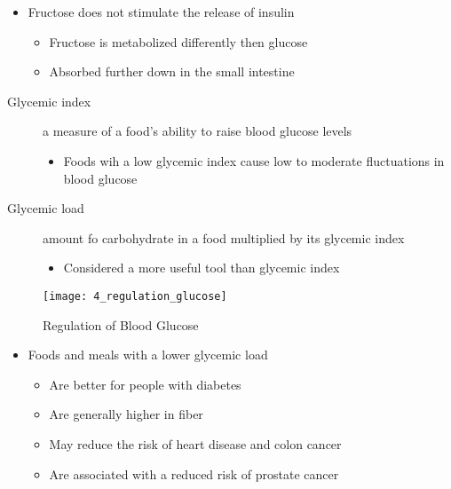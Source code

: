 \documentclass[title={Chapter 4}]{fdsn201notes}
\begin{document}
\begin{itemize}
	\item Fructose does not stimulate the release of insulin
	\begin{itemize}
		\item Fructose is metabolized differently then glucose
		\item Absorbed further down in the small intestine
	\end{itemize}
\end{itemize}

\begin{description}
	\item[Glycemic index] a measure of a food's ability to raise blood glucose levels
	\begin{itemize}
		\item Foods wih a low glycemic index cause low to moderate fluctuations in blood glucose
	\end{itemize}
	\item[Glycemic load] amount fo carbohydrate in a food multiplied by its glycemic index
	\begin{itemize}
		\item Considered a more useful tool than glycemic index
	\end{itemize}
\end{description}

\begin{figure}[H]
	\centering
	\texttt{[image: 4\_regulation\_glucose]}
	\caption{Regulation of Blood Glucose}
	\label{fig:Regulation-of-Blood-Glucose}
\end{figure}

\begin{itemize}
	\item Foods and meals with a lower glycemic load
	\begin{itemize}
		\item Are better for people with diabetes
		\item Are generally higher in fiber
		\item May reduce the risk of heart disease and colon cancer
		\item Are associated with a reduced risk of prostate cancer
	\end{itemize}
\end{itemize}
\end{document}
